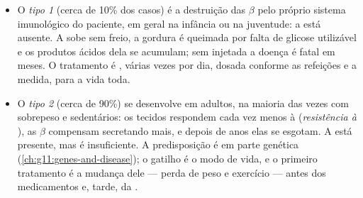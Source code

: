 \begin{proposition}\label{prop:g12:glucose-and-diabetes:types}
\begin{itemize}
  \item O \emph{ tipo 1} (cerca de 10\% dos casos) é a
        destruição das  $\beta$ pelo próprio sistema imunológico
        do paciente, em geral na infância ou na juventude: a 
        está ausente. A  sobe sem freio, a gordura é queimada
        por falta de glicose utilizável e os produtos ácidos dela se
        acumulam; sem  injetada a doença é fatal em meses. O
        tratamento é , várias vezes por dia, dosada conforme as
        refeições e a  medida, para a vida toda.
  \item O \emph{ tipo 2} (cerca de 90\%) se desenvolve em
        adultos, na maioria das vezes com sobrepeso e sedentários: os
        tecidos respondem cada vez menos à  (\emph{resistência
        à }), as  $\beta$ compensam secretando mais, e
        depois de anos elas se esgotam. A  está presente, mas
        é insuficiente. A predisposição é em parte genética
        (\cref{ch:g11:genes-and-disease}); o gatilho é o modo de vida,
        e o primeiro tratamento é a mudança dele --- perda de peso e
        exercício --- antes dos medicamentos e, tarde, da .
\end{itemize}
\end{proposition}
